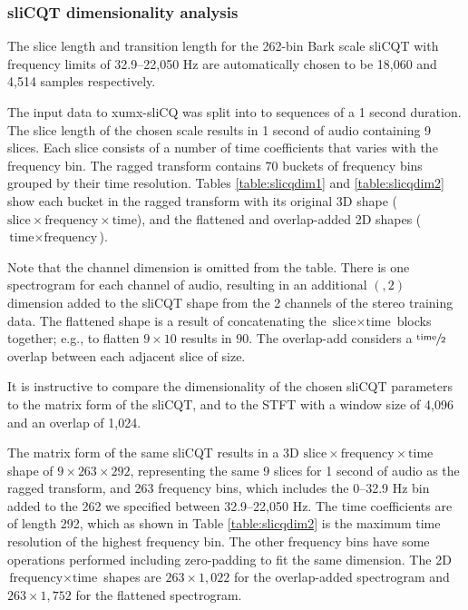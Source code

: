 \documentclass[report.tex]{subfiles}
\begin{document}
\subsubsection{sliCQT dimensionality analysis}

The slice length and transition length for the 262-bin Bark scale sliCQT with frequency limits of 32.9--22,050 Hz are automatically chosen to be 18,060 and 4,514 samples respectively.

The input data to xumx-sliCQ was split into to sequences of a 1 second duration. The slice length of the chosen scale results in 1 second of audio containing 9 slices. Each slice consists of a number of time coefficients that varies with the frequency bin. The ragged transform contains 70 buckets of frequency bins grouped by their time resolution. Tables \ref{table:slicqdim1} and \ref{table:slicqdim2} show each bucket in the ragged transform with its original 3D shape ($\text{slice} \times \text{frequency} \times \text{time}$), and the flattened and overlap-added 2D shapes ($\text{time} \times \text{frequency}$).

Note that the channel dimension is omitted from the table. There is one spectrogram for each channel of audio, resulting in an additional $(,2)$ dimension added to the sliCQT shape from the 2 channels of the stereo training data. The flattened shape is a result of concatenating the $\text{slice} \times \text{time}$ blocks together; e.g., to flatten $9 \times 10$ results in $90$. The overlap-add considers a $\sfrac{\text{time}}{2}$ overlap between each adjacent slice of size.

It is instructive to compare the dimensionality of the chosen sliCQT parameters to the matrix form of the sliCQT, and to the STFT with a window size of 4,096 and an overlap of 1,024.

The matrix form of the same sliCQT results in a 3D $\text{slice} \times \text{frequency} \times \text{time}$ shape of $9 \times 263 \times 292$, representing the same 9 slices for 1 second of audio as the ragged transform, and 263 frequency bins, which includes the 0--32.9 Hz bin added to the 262 we specified between 32.9--22,050 Hz. The time coefficients are of length 292, which as shown in Table \ref{table:slicqdim2} is the maximum time resolution of the highest frequency bin. The other frequency bins have some operations performed including zero-padding to fit the same dimension. The 2D $\text{frequency} \times \text{time}$ shapes are $263 \times 1{,}022$ for the overlap-added spectrogram and $263 \times 1{,}752$ for the flattened spectrogram.
\end{document}
